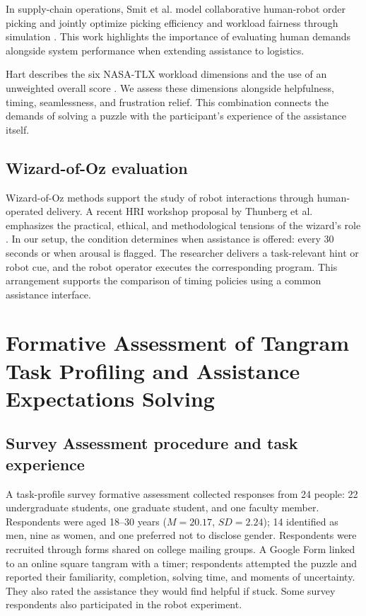 \documentclass[sigconf,anonymous,balance=false]{aamas}
\providecommand{\DIFadd}[1]{{\protect\color{blue} \sf #1}} %
\providecommand{\DIFdel}[1]{{\protect\color{red} \scriptsize #1}} %
\providecommand{\DIFaddbegin}{} %
\providecommand{\DIFaddend}{} %
\providecommand{\DIFdelbegin}{} %
\providecommand{\DIFdelend}{} %
\begin{document}
\DIFaddbegin \DIFadd{In supply-chain operations, Smit et al. model collaborative human-robot order picking and jointly optimize picking efficiency and workload fairness through simulation \cite{smit2024}. This work highlights the importance of evaluating human demands alongside system performance when extending assistance to logistics.
}

\DIFaddend Hart describes the six NASA-TLX workload dimensions and the use of an unweighted overall score \cite{hart2006}. We assess these dimensions alongside helpfulness, timing, seamlessness, and frustration relief. This combination connects the demands of solving a puzzle with the participant's experience of the assistance itself.

\subsection{Wizard-of-Oz evaluation}

Wizard-of-Oz methods support the study of robot interactions through human-operated delivery. A recent HRI workshop proposal by Thunberg et al. emphasizes the practical, ethical, and methodological tensions of the wizard's role \cite{thunberg2026}. In our setup, the condition determines when assistance is offered: every 30 seconds or when arousal is flagged. The researcher delivers a task-relevant hint or robot cue, and the robot operator executes the corresponding program. This arrangement supports the comparison of timing policies using a common assistance interface.

\section{\DIFaddbegin \DIFadd{Formative Assessment of }\DIFaddend Tangram \DIFdelbegin \DIFdel{Task Profiling and Assistance Expectations}\DIFdelend \DIFaddbegin \DIFadd{Solving}\DIFaddend }

\subsection{\DIFdelbegin \DIFdel{Survey }\DIFdelend \DIFaddbegin \DIFadd{Assessment procedure }\DIFaddend and task experience}

A \DIFdelbegin \DIFdel{task-profile survey }\DIFdelend \DIFaddbegin \DIFadd{formative assessment }\DIFaddend collected responses from 24 people: 22 undergraduate students, one graduate student, and one faculty member. Respondents were aged 18--30 years ($M=20.17$, $SD=2.24$); 14 identified as men, nine as women, and one preferred not to disclose gender. Respondents were recruited through forms shared on college mailing groups. A Google Form linked to an online square tangram with a timer; respondents attempted the puzzle and reported their familiarity, completion, solving time, and moments of uncertainty. They also rated the assistance they would find helpful if stuck. Some \DIFdelbegin \DIFdel{survey }\DIFdelend respondents also participated in the robot experiment.
\end{document}
